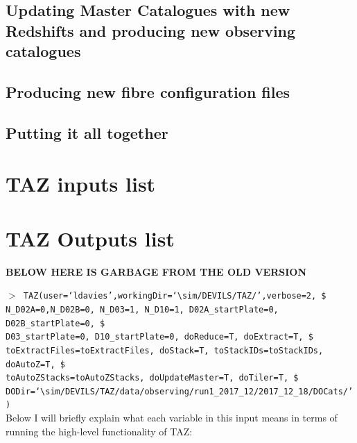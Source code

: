 \documentclass[12pt]{article}
\begin{document}
 \subsection{Updating Master Catalogues with new Redshifts and producing new observing catalogues}


 \subsection{Producing new fibre configuration files}
 
 
 \subsection{Putting it all together}


\section{TAZ inputs list}

\section{TAZ Outputs list}












\textbf{BELOW HERE IS GARBAGE FROM THE OLD VERSION}




\hspace{10mm} \texttt{$>$ TAZ(user=`ldavies',workingDir=`$\sim$/DEVILS/TAZ/',verbose=2, \$ \\
N\_D02A=0,N\_D02B=0, N\_D03=1, N\_D10=1, D02A\_startPlate=0, D02B\_startPlate=0, \$ \\ 
D03\_startPlate=0, D10\_startPlate=0,  doReduce=T, doExtract=T,  \$ \\
toExtractFiles=toExtractFiles, doStack=T, toStackIDs=toStackIDs, doAutoZ=T, \$ \\
toAutoZStacks=toAutoZStacks, doUpdateMaster=T, doTiler=T, \$ \\
DODir=`$\sim$/DEVILS/TAZ/data/observing/run1\_2017\_12/2017\_12\_18/DOCats/')} \\

Below I will briefly explain what each variable in this input means in terms of running the high-level functionality of TAZ:\\
\end{document}
